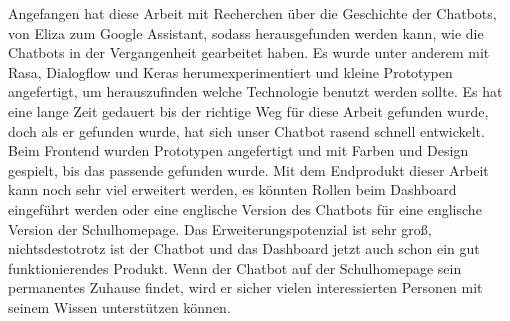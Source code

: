 Angefangen hat diese Arbeit mit Recherchen über die Geschichte der Chatbots, von Eliza zum Google Assistant, sodass herausgefunden werden kann, wie die Chatbots in der Vergangenheit gearbeitet haben.
Es wurde unter anderem mit Rasa, Dialogflow und Keras herumexperimentiert und kleine Prototypen angefertigt, um herauszufinden welche Technologie benutzt werden sollte.
Es hat eine lange Zeit gedauert bis der richtige Weg für diese Arbeit gefunden wurde, doch als er gefunden wurde, hat sich unser Chatbot rasend schnell entwickelt.
Beim Frontend wurden Prototypen angefertigt und mit Farben und Design gespielt, bis das passende gefunden wurde.
Mit dem Endprodukt dieser Arbeit kann noch sehr viel erweitert werden, es könnten Rollen beim Dashboard eingeführt werden oder eine englische Version des Chatbots für eine englische Version der Schulhomepage.
Das Erweiterungspotenzial ist sehr groß, nichtsdestotrotz ist der Chatbot und das Dashboard jetzt auch schon ein gut funktionierendes Produkt.
Wenn der Chatbot auf der Schulhomepage sein permanentes Zuhause findet, wird er sicher vielen interessierten Personen mit seinem Wissen unterstützen können.
